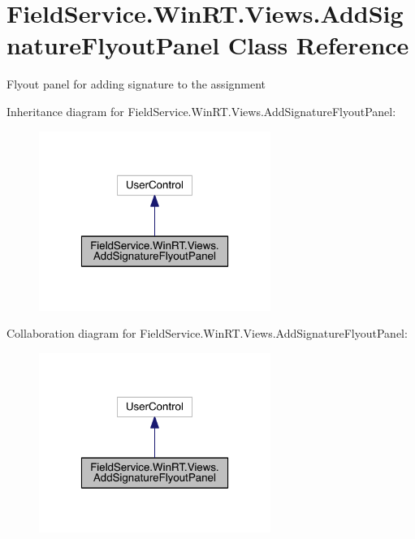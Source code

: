 \hypertarget{class_field_service_1_1_win_r_t_1_1_views_1_1_add_signature_flyout_panel}{\section{Field\+Service.\+Win\+R\+T.\+Views.\+Add\+Signature\+Flyout\+Panel Class Reference}
\label{class_field_service_1_1_win_r_t_1_1_views_1_1_add_signature_flyout_panel}
}


Flyout panel for adding signature to the assignment  




Inheritance diagram for Field\+Service.\+Win\+R\+T.\+Views.\+Add\+Signature\+Flyout\+Panel\+:
\nopagebreak
\begin{figure}[H]
\begin{center}
\leavevmode
\includegraphics[width=214pt]{class_field_service_1_1_win_r_t_1_1_views_1_1_add_signature_flyout_panel__inherit__graph}
\end{center}
\end{figure}


Collaboration diagram for Field\+Service.\+Win\+R\+T.\+Views.\+Add\+Signature\+Flyout\+Panel\+:
\nopagebreak
\begin{figure}[H]
\begin{center}
\leavevmode
\includegraphics[width=214pt]{class_field_service_1_1_win_r_t_1_1_views_1_1_add_signature_flyout_panel__coll__graph}
\end{center}
\end{figure}
